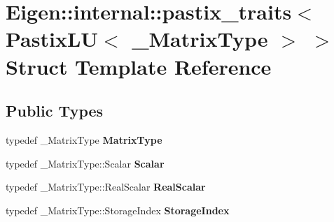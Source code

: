 \hypertarget{struct_eigen_1_1internal_1_1pastix__traits_3_01_pastix_l_u_3_01___matrix_type_01_4_01_4}{}\section{Eigen\+:\+:internal\+:\+:pastix\+\_\+traits$<$ Pastix\+LU$<$ \+\_\+\+Matrix\+Type $>$ $>$ Struct Template Reference}
\label{struct_eigen_1_1internal_1_1pastix__traits_3_01_pastix_l_u_3_01___matrix_type_01_4_01_4}
\subsection*{Public Types}
\begin{DoxyCompactItemize}
\item 
\mbox{\label{struct_eigen_1_1internal_1_1pastix__traits_3_01_pastix_l_u_3_01___matrix_type_01_4_01_4_ad5cf594f74d7538987a75f5db284ee4a}} 
typedef \+\_\+\+Matrix\+Type {\bfseries Matrix\+Type}
\item 
\mbox{\label{struct_eigen_1_1internal_1_1pastix__traits_3_01_pastix_l_u_3_01___matrix_type_01_4_01_4_a9a3a36d1582355961fc61b56accce68b}} 
typedef \+\_\+\+Matrix\+Type\+::\+Scalar {\bfseries Scalar}
\item 
\mbox{\label{struct_eigen_1_1internal_1_1pastix__traits_3_01_pastix_l_u_3_01___matrix_type_01_4_01_4_ab730372ff0f43dc2af281a4513832735}} 
typedef \+\_\+\+Matrix\+Type\+::\+Real\+Scalar {\bfseries Real\+Scalar}
\item 
\mbox{\label{struct_eigen_1_1internal_1_1pastix__traits_3_01_pastix_l_u_3_01___matrix_type_01_4_01_4_a18b75c7eedd17fd2ceb4011394ef650b}} 
typedef \+\_\+\+Matrix\+Type\+::\+Storage\+Index {\bfseries Storage\+Index}
\item 
\mbox{\label{struct_eigen_1_1internal_1_1pastix__traits_3_01_pastix_l_u_3_01___matrix_type_01_4_01_4_ad5cf594f74d7538987a75f5db284ee4a}} 

\end{DoxyCompactItemize}
